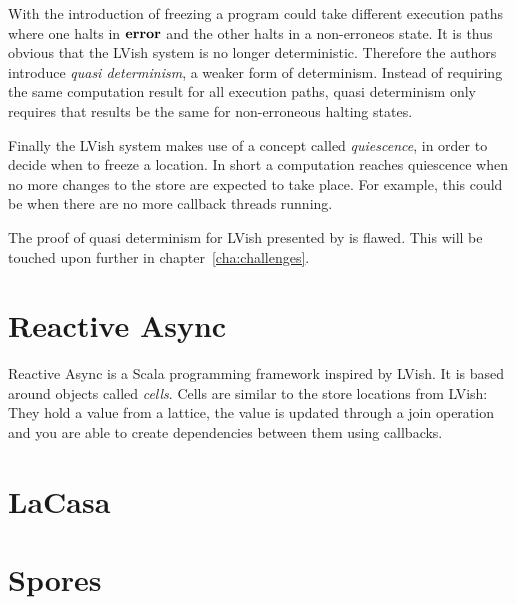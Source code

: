 With the introduction of freezing a program could take different execution
paths where one halts in $\mbox{{\bf error}}$ and the other halts in a non-erroneos state.
It is thus obvious that the LVish system is no longer deterministic. Therefore
the authors introduce \emph{quasi determinism}, a weaker form of
determinism. Instead of requiring the same computation result for all execution
paths, quasi determinism only requires that results be the same for
non-erroneous halting states.

Finally the LVish system makes use of a concept called \emph{quiescence}, in
order to decide when to freeze a location. In short a computation reaches
quiescence when no more changes to the store are expected to take place. For
example, this could be when there are no more callback threads running.

The proof of quasi determinism for LVish presented by
\textcite{kuper2014freezeTR} is flawed. This will be touched upon further in
chapter~\ref{cha:challenges}.


\section{Reactive Async}\label{sec:reactive_async}

Reactive Async is a Scala programming framework inspired by LVish. It is based
around objects called \emph{cells}.  Cells are similar to the store locations
from LVish: They hold a value from a lattice, the value is updated through a
join operation and you are able to create dependencies between them using
callbacks.






\section{LaCasa}\label{sec:lacasa}


\section{Spores}\label{sec:spores}




